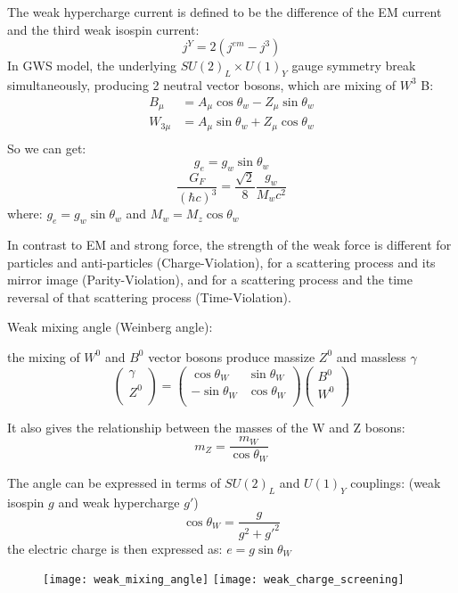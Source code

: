 The weak hypercharge current is defined to be the difference of the EM current 
and the third weak isospin current:
$$ j^Y = 2(j^{em} - j^3) $$
In GWS model, the underlying $SU(2)_L \times U(1)_Y$ gauge symmetry break 
simultaneously, producing 2 neutral vector bosons, which are mixing of $W^3$ B:
\begin{equation*}
    \begin{aligned}
	B_\mu &= A_\mu\cos \theta_w - Z_\mu \sin \theta_w	\\
	W_{3\mu} &= A_\mu\sin \theta_w + Z_\mu \cos \theta_w	\\
    \end{aligned}
\end{equation*}
So we can get:
$$ g_e = g_w\sin\theta_w$$
$$ \frac{G_F}{(\hbar c)^3} = \frac{\sqrt{2}}{8}\frac{g_w}{M_w c^2} $$
where: $g_e = g_w\sin\theta_w$ and $M_w = M_z\cos\theta_w$


In contrast to EM and strong force, the strength of the weak force is different
for particles and anti-particles (Charge-Violation), for a scattering process
and its mirror image (Parity-Violation), and for a scattering process and the 
time reversal of that scattering process (Time-Violation).

Weak mixing angle (Weinberg angle):

the mixing of $W^0$ and $B^0$ vector bosons produce massize $Z^0$ and massless
$\gamma$ 
\begin{equation*}
    \begin{pmatrix}
	\gamma	\\
	Z^0	\\
    \end{pmatrix}
    =
    \begin{pmatrix}
	\cos\theta_W	& \sin\theta_W	\\
	-\sin\theta_W	& \cos\theta_W	\\
    \end{pmatrix}
    \begin{pmatrix}
	B^0 \\
	W^0 \\
    \end{pmatrix}
\end{equation*}

It also gives the relationship between the masses of the W and Z bosons:
\begin{equation*}
    m_Z = \frac{m_W}{\cos\theta_W}
\end{equation*}

The angle can be expressed in terms of $SU(2)_L$ and $U(1)_Y$ couplings:
(weak isospin $g$ and weak hypercharge $g'$)
\begin{equation*}
    \cos\theta_W = \frac{g}{g^2 + g'^2}
\end{equation*}
the electric charge is then expressed as: $e = g\sin\theta_W$
\begin{figure}[h]
    \texttt{[image: weak\_mixing\_angle]}
    \texttt{[image: weak\_charge\_screening]}
\end{figure}

